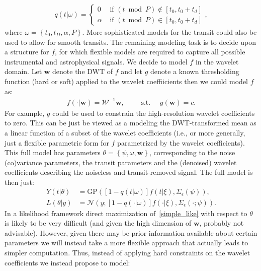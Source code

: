 \documentclass[a4paper,11pt]{article}
\begin{document}
\begin{align*}
 q(t|\omega) = \left\{ \begin{array}{cl}
 0 & \textrm{ if } (t\bmod{P}) \notin{} \left[t_{0},t_{0}+t_{d}\right] \\
 \alpha & \textrm{ if }  (t\bmod{P}) \in \left[t_{0},t_{0}+t_{d}\right] 
 \end{array}\right. ,
\end{align*}
where $\omega=\left\{t_{0},t_{D},\alpha,P\right\}$. More sophisticated models for the transit could also be used to allow for smooth transits. The remaining modeling task is to decide upon a structure for $f$, for which flexible models are required to capture all possible instrumental and astrophysical signals. We decide to model $f$ in the wavelet domain. Let $\mathbf{w}$ denote the DWT of $f$ and let $g$ denote a known thresholding function (hard or soft) applied to the wavelet coeffiicients then we could model $f$ as:
\begin{align}\label{wv_def}
 f(\cdot|\mathbf{w}) = \mathcal{W}^{-1}\mathbf{w} , \qquad \textrm{ s.t. } \quad  g(\mathbf{w})=c .
\end{align}
For example, $g$ could be used to constrain the high-resolution wavelet coefficients to zero. This can be just be viewed as a modeling the DWT-transformed mean as a linear function of a subset of the wavelet coefficients (i.e., or more generally, just a flexible parametric form for $f$ parametrized by the wavelet coefficients). This full model has parameters $\theta=\left\{\psi,\omega,\mathbf{w}\right\}$, corresponding to the noise (co)variance parameters, the transit parameters and the (denoised) wavelet coefficients describing the noiseless and transit-removed signal. The full model is then just:
\begin{align}
\nonumber
 Y(t|\theta) &= \textrm{GP}\left(\left[1-q(t|\omega)\right]f(t|\xi),\Sigma_{\epsilon}(\psi)\right) , \\
 \label{simple_like}
 L(\theta|y) &= \mathcal{N}\left(y;\left[1-q(\cdot{}|\omega)\right]f(\cdot{}|\xi),\Sigma_{\epsilon}(\cdot;\psi)\right) . 
\end{align}
In a likelihood framework direct maximization of~\eqref{simple_like} with respect to $\theta$ is likely to be very difficult (and given the high dimension of $\mathbf{w}$, probably not advisable). However, given there may be prior information available about certain parameters we will instead take a more flexible approach that actually leads to simpler computation. Thus, instead of applying hard constraints on the wavelet coefficients we instead propose to model:
\end{document}
